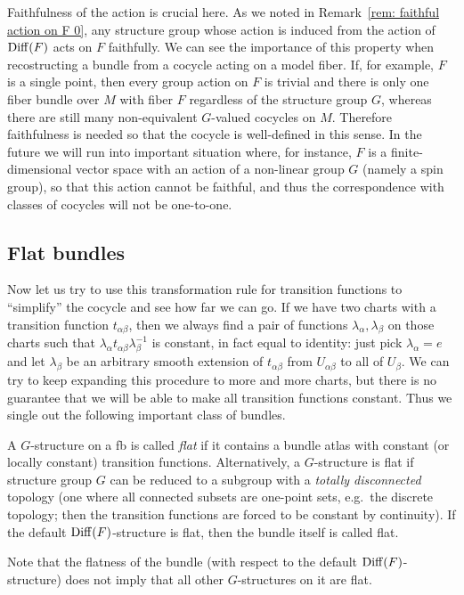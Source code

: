 \begin{rem}\label{rem: faithfulness of action on F}
    Faithfulness of the action is crucial here. As we noted in Remark~\ref{rem: faithful action on F 0}, any structure group whose action is induced from the action of $\operatorname{Diff}(F)$ acts on $F$ faithfully. We can see the importance of this property when recostructing a bundle from a cocycle acting on a model fiber. If, for example, $F$ is a single point, then every group action on $F$ is trivial and there is only one fiber bundle over $M$ with fiber $F$ regardless of the structure group $G$, whereas there are still many non-equivalent $G$-valued cocycles on $M$. Therefore faithfulness is needed so that the cocycle is well-defined in this sense. In the future we will run into important situation where, for instance, $F$ is a finite-dimensional vector space with an action of a non-linear group $G$ (namely a spin group), so that this action cannot be faithful, and thus the correspondence with classes of cocycles will not be one-to-one.
\end{rem}






\subsection{Flat bundles}

Now let us try to use this transformation rule for transition functions to ``simplify'' the cocycle and see how far we can go. If we have two charts with a transition function $t_{\alpha\beta}$, then we always find a pair of functions $\lambda_\alpha,\lambda_\beta$ on those charts such that $\lambda_\alpha t_{\alpha\beta}\lambda_\beta^{-1}$ is constant, in fact equal to identity: just pick $\lambda_\alpha=e$ and let $\lambda_\beta$ be an arbitrary smooth extension of $t_{\alpha\beta}$ from $U_{\alpha\beta}$ to all of $U_\beta$. We can try to keep expanding this procedure to more and more charts, but there is no guarantee that we will be able to make all transition functions constant. Thus we single out the following important class of bundles.

\begin{defn}\label{def flat G-bundle}
	A $G$-structure on a \gls{fb} is called \emph{flat} if it contains a bundle atlas with constant (or locally constant) transition functions. Alternatively, a $G$-structure is flat if structure group $G$ can be reduced to a subgroup with a \emph{totally disconnected} topology (one where all connected subsets are one-point sets, e.g.\ the discrete topology; then the transition functions are forced to be constant by continuity). If the default $\operatorname{Diff}(F)$-structure is flat, then the bundle itself is called flat.
\end{defn}
\begin{rem}
    Note that the flatness of the bundle (with respect to the default $\operatorname{Diff}(F)$-structure) does not imply that all other $G$-structures on it are flat.
\end{rem}


